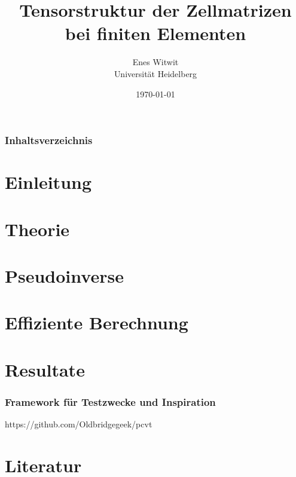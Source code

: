\documentclass[hyperref={pdfpagelabels=false}]{beamer}
\title{Tensorstruktur der Zellmatrizen bei finiten Elementen }
\author{Enes Witwit \\ Universität Heidelberg}
\date{\today}
\begin{document}
\begin{frame}
\titlepage
\end{frame} 


\begin{frame}
\frametitle{Inhaltsverzeichnis}
\setcounter{tocdepth}{1}
\small{ \tableofcontents}
\end{frame}

\section{Einleitung} 
\begin{frame}
\small{\tableofcontents[currentsection]}
\end{frame}



\section{Theorie}
\begin{frame}
\small{\tableofcontents[currentsection]}
\end{frame}


\section{Pseudoinverse}
\begin{frame}
\small{\tableofcontents[currentsection]}
\end{frame}


\section{Effiziente Berechnung}
\begin{frame}
\small{\tableofcontents[currentsection]}
\end{frame}


\section{Resultate}
\begin{frame}
\small{\tableofcontents[currentsection]}
\end{frame}

\begin{frame}
\frametitle{Framework für Testzwecke und Inspiration}
https://github.com/Oldbridgegeek/pcvt
\end{frame}

\section*{Literatur}
\begin{frame}


\end{frame}
\end{document}
